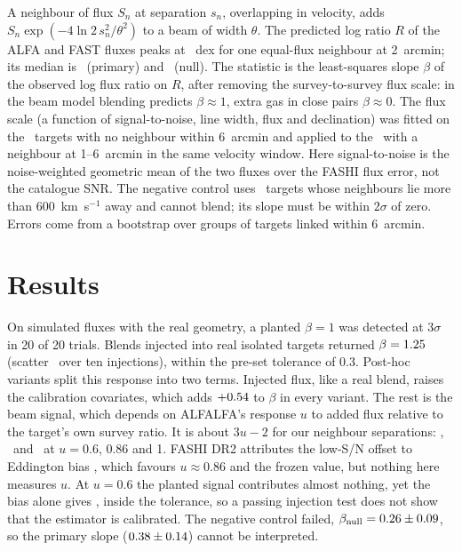 \documentclass[twocolumn]{aastex631}
\begin{document}
A neighbour of flux $S_n$ at separation $s_n$, overlapping in velocity, adds
$S_n\exp(-4\ln2\,s_n^2/\theta^2)$ to a beam of width $\theta$. The predicted log ratio $R$ of the
ALFA and FAST fluxes peaks at \hbRealSignal~dex for one equal-flux neighbour at 2~arcmin; its
median is \hbRealRprimMed\ (primary) and \hbRealRnullMed\ (null). The statistic is the least-squares slope $\beta$ of
the observed log flux ratio on $R$, after removing the survey-to-survey flux scale: in the beam
model blending predicts $\beta\approx1$, extra gas in close pairs $\beta\approx0$. The flux scale (a function of
signal-to-noise, line width, flux and declination) was fitted on the \hbRealNIsolated\ targets
with no neighbour within 6~arcmin and applied to the \hbRealNPrimary\ with a neighbour at
1--6~arcmin in the same velocity window. Here signal-to-noise is the noise-weighted geometric
mean of the two fluxes over the FASHI flux error, not the catalogue SNR. The negative control
uses \hbRealNNull\ targets whose neighbours lie more than 600~km~s$^{-1}$ away and cannot blend;
its slope must be within $2\sigma$ of zero. Errors come from a bootstrap over groups of targets
linked within 6~arcmin.

\section{Results}
\label{sec:results}
On simulated fluxes with the real geometry, a planted $\beta=1$ was detected at $3\sigma$ in
20 of 20 trials. Blends injected into real isolated targets returned $\beta=1.25$
(scatter \hbRealInjOneSd\ over ten injections), within the pre-set tolerance of 0.3. Post-hoc
variants split this response into two terms. Injected flux, like a real blend, raises the
calibration covariates, which adds $+0.54$ to $\beta$ in every variant. The rest is
the beam signal, which depends on ALFALFA's response $u$ to added flux relative to the target's
own survey ratio. It is about $3u-2$ for our neighbour separations: \hbRealUFrozLo,
\hbRealUFrozMid\ and \hbRealUFrozHi\ at $u=0.6$, 0.86 and 1. FASHI DR2 attributes the low-S/N
offset to Eddington bias \citep[][\S~5.2]{fashi_dr2}, which favours $u\approx0.86$ and the frozen
value, but nothing here measures $u$. At $u=0.6$ the planted signal contributes almost nothing,
yet the bias alone gives \hbRealUProdLo, inside the tolerance, so a passing injection test does
not show that the estimator is calibrated. The negative control failed,
$\beta_{\rm null}=0.26\pm0.09$, so the primary slope
($0.38\pm0.14$) cannot be interpreted.
\end{document}
